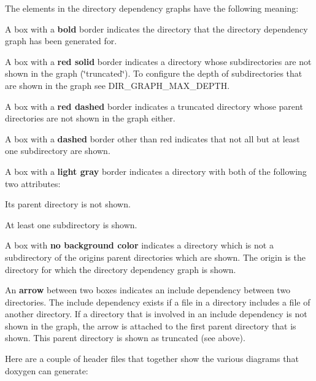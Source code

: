 The elements in the directory dependency graphs have the following meaning\+: 
\begin{DoxyItemize}
\item A box with a {\bfseries{bold}} border indicates the directory that the directory dependency graph has been generated for. 
\item A box with a {\bfseries{red solid}} border indicates a directory whose subdirectories are not shown in the graph (\char`\"{}truncated\char`\"{}). To configure the depth of subdirectories that are shown in the graph see D\+I\+R\+\_\+\+G\+R\+A\+P\+H\+\_\+\+M\+A\+X\+\_\+\+D\+E\+P\+TH. 
\item A box with a {\bfseries{red dashed}} border indicates a truncated directory whose parent directories are not shown in the graph either. 
\item A box with a {\bfseries{dashed}} border other than red indicates that not all but at least one subdirectory are shown. 
\item A box with a {\bfseries{light gray}} border indicates a directory with both of the following two attributes\+: 
\begin{DoxyItemize}
\item Its parent directory is not shown. 
\item At least one subdirectory is shown. 
\end{DoxyItemize}
\item A box with {\bfseries{no background color}} indicates a directory which is not a subdirectory of the origin\textquotesingle{}s parent directories which are shown. The origin is the directory for which the directory dependency graph is shown. 
\item An {\bfseries{arrow}} between two boxes indicates an include dependency between two directories. The include dependency exists if a file in a directory includes a file of another directory. If a directory that is involved in an include dependency is not shown in the graph, the arrow is attached to the first parent directory that is shown. This parent directory is shown as truncated (see above). 
\end{DoxyItemize}

Here are a couple of header files that together show the various diagrams that doxygen can generate\+:

